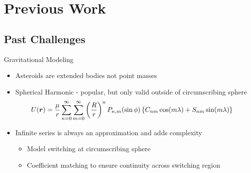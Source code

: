 \documentclass[11pt,professionalfonts]{beamer}
\begin{document}
\section*{Previous Work}
\subsection*{Past Challenges}

\begin{frame}{Gravitational Modeling} %

\begin{itemize}
  \item Asteroids are extended bodies not point masses
  \item Spherical Harmonic - popular, but only valid outside of circumscribing sphere
    {
    \small
    \begin{align*}
      U(\bm{r} ) = \frac{\mu}{r} \sum_{n=0}^\infty \sum_{m=0}^\infty \left( \frac{R}{r} \right)^nP_{n,m}(\sin \phi) \left\{  C_{nm} \cos(m \lambda) + S_{nm} \sin(m \lambda) \right\} 
    \end{align*}
    }
  \item Infinite series is always an approximation and adds complexity
    \begin{itemize}
        \item Model switching at circumscribing sphere
        \item Coefficient matching to ensure continuity across switching region
    \end{itemize}
\end{itemize}


\end{frame}   %
\end{document}
